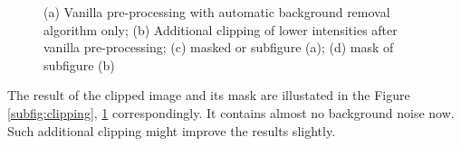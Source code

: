 \begin{figure}
\begin{subfigure}[b]{0.22\textwidth}
		\caption{}
		\label{subfig:clipping-mask}
	\end{subfigure}
	   \caption{(a) Vanilla pre-processing with automatic background removal algorithm only; (b) Additional clipping of lower intensities after vanilla pre-processing; (c) masked or subfigure (a); (d) mask of subfigure (b)}
	   \label{fig:pre-processing-golgi}
\end{figure}

The result of the clipped image and its mask are illustated in the Figure \ref{subfig:clipping}, \ref{subfig:clipping-mask} correspondingly. It contains almost no background noise now. Such additional clipping might improve the results slightly.